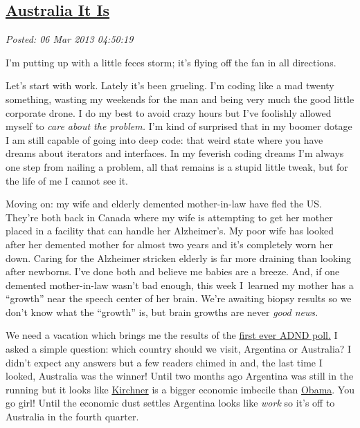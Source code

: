 %

\subsection*{\href{http://bakerjd99.wordpress.com/2013/03/05/australia-it-is/}{Australia It Is}}


\noindent\emph{Posted: 06 Mar 2013 04:50:19}
\vspace{6pt}

I'm putting up with a little feces storm; it's flying off the fan in all
directions.

Let's start with work. Lately it's been grueling. I'm coding like a mad
twenty something, wasting my weekends for the man and being very much
the good little corporate drone. I do my best to avoid crazy hours but
I've foolishly allowed myself to \emph{care about the problem.} I'm kind
of surprised that in my boomer dotage I am still capable of going into
deep code: that weird state where you have dreams about iterators and
interfaces. In my feverish coding dreams I'm always one step from
nailing a problem, all that remains is a stupid little tweak, but for
the life of me I cannot see it.

Moving on: my wife and elderly demented mother-in-law have fled the US.
They're both back in Canada where my wife is attempting to get her
mother placed in a facility that can handle her Alzheimer's. My poor wife
has looked after her demented mother for almost two years and it's
completely worn her down. Caring for the Alzheimer stricken elderly is
far more draining than looking after newborns. I've done both and
believe me babies are a breeze. And, if one demented mother-in-law
wasn't bad enough, this week I~learned my mother has a ``growth'' near
the speech center of her brain. We're awaiting biopsy results so we
don't know what the ``growth'' is, but brain growths are never \emph{good
news.}

We need a vacation which brings me the results of the
\href{http://polldaddy.com/poll/6805019/}{first ever ADND poll.} I
asked a simple question: which country should we visit, Argentina or
Australia? I didn't expect any answers but a few readers chimed in and,
the last time I looked, Australia was the winner! Until two months ago
Argentina was still in the running but it looks like
\href{http://www.telegraph.co.uk/news/worldnews/southamerica/argentina/9890078/Argentina-dispatch-the-troubled-reign-of-Queen-Cristina-of-Argentina.html}{Kirchner} is
a bigger economic imbecile than
\href{http://news.investors.com/ibd-editorials/010713-639635-obama-says-there-is-no-spending-problem.htm}{Obama}.
You go girl! Until the economic dust settles Argentina looks like
\emph{work} so it's off to Australia in the fourth quarter.

